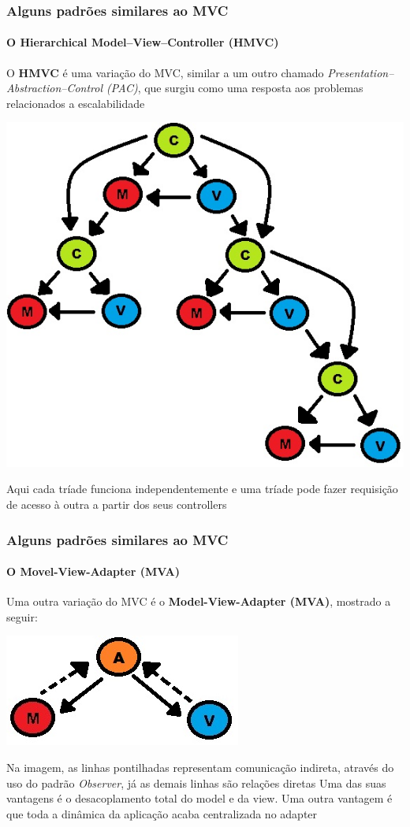 \documentclass{beamer}
\begin{document}
\begin{frame}
\frametitle{Alguns padrões similares ao MVC}
\framesubtitle{O Hierarchical Model–View–Controller (HMVC)}
	O \textbf{HMVC} é uma variação do MVC, similar a um outro chamado \textit{Presentation–Abstraction–Control (PAC)}, que surgiu como uma resposta aos problemas
	relacionados a escalabilidade
	\begin{center}
		\includegraphics[scale=0.175]{HMVC.jpg}
	\end{center}
	Aqui cada tríade funciona independentemente e uma tríade pode fazer requisição de acesso à outra a partir dos seus controllers
\end{frame}

\begin{frame}
\frametitle{Alguns padrões similares ao MVC}
\framesubtitle{O Movel-View-Adapter (MVA)}
	Uma outra variação do MVC é o \textbf{Model-View-Adapter (MVA)}, mostrado a seguir:
	\begin{center}
		\includegraphics[scale=0.4]{MVA.jpg}
	\end{center}
	Na imagem, as linhas pontilhadas representam comunicação indireta, através do uso do padrão \textit{Observer}, já as demais linhas são relações diretas
	Uma das suas vantagens é o desacoplamento total do model e da view. Uma outra vantagem é que toda a dinâmica da aplicação acaba centralizada no adapter
\end{frame}
\end{document}
